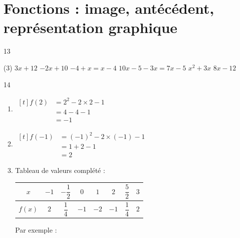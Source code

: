 \documentclass[10pt,a4paper]{article}
\begin{document}
\section{Fonctions : image, antécédent, représentation graphique}

\begin{corr}{13}
\begin{tasks}(3)
    \task \(3x+12\)
    \task \(-2x+10\)
    \task \(-4+x=x-4\)
    \task \(10x-5-3x=7x-5\)
    \task \(x^2+3x\)
    \task \(8x-12\)
\end{tasks}
\end{corr}

\begin{corr}[Guidé]{14}
\begin{enumerate}[leftmargin=*]
    \item \(\begin{aligned}[t] f(2)&=2^2-2\times 2-1\\ &=4-4-1\\ &=-1\end{aligned}\)
    \item \(\begin{aligned}[t] f(-1)&=(-1)^2-2\times(-1)-1\\ &=1+2-1\\ &=2\end{aligned}\)
    \item Tableau de valeurs complété :
    \begin{center}
    \renewcommand{\arraystretch}{2}
    \begin{tabular}{|*{8}{c|}}
        \hline
        \(x\) & \(-1\) & \(-\dfrac{1}{2}\) & \(0\) & \(1\) & \(2\) & \(\dfrac{5}{2}\) & \(3\) \\
        \hline
        \(f(x)\) & \(2\) & \(\dfrac{1}{4}\) & \(-1\) & \(-2\) & \(-1\) & \(\dfrac{1}{4}\) & \(2\) \\
        \hline
    \end{tabular}
    \end{center}
    Par exemple :


\end{enumerate}
\end{corr}
\end{document}
